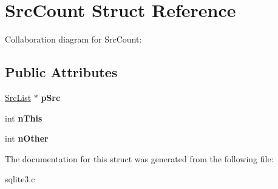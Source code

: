 \hypertarget{structSrcCount}{}\section{Src\+Count Struct Reference}
\label{structSrcCount}


Collaboration diagram for Src\+Count\+:
\subsection*{Public Attributes}
\begin{DoxyCompactItemize}
\item 
\hyperlink{structSrcList}{Src\+List} $\ast$ {\bfseries p\+Src}\hypertarget{structSrcCount_a7087f00bcaed39cc5032462d7262f4ff}{}\label{structSrcCount_a7087f00bcaed39cc5032462d7262f4ff}

\item 
int {\bfseries n\+This}\hypertarget{structSrcCount_a1aaa40ff75460ebc7778ea63aca14d4d}{}\label{structSrcCount_a1aaa40ff75460ebc7778ea63aca14d4d}

\item 
int {\bfseries n\+Other}\hypertarget{structSrcCount_a5666f8571b2877fdadfe95364ffb5b80}{}\label{structSrcCount_a5666f8571b2877fdadfe95364ffb5b80}

\end{DoxyCompactItemize}


The documentation for this struct was generated from the following file\+:\begin{DoxyCompactItemize}
\item 
sqlite3.\+c\end{DoxyCompactItemize}
